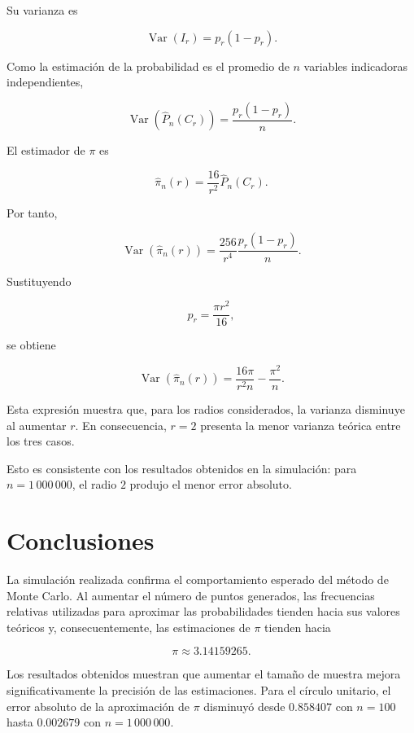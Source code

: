 \documentclass[12pt,a4paper]{article}
\begin{document}
Su varianza es

\[
\operatorname{Var}(I_r)
=
p_r(1-p_r).
\]

Como la estimación de la probabilidad es el promedio de \(n\)
variables indicadoras independientes,

\[
\operatorname{Var}
\left(
\widehat{P}_n(C_r)
\right)
=
\frac{p_r(1-p_r)}{n}.
\]

El estimador de \(\pi\) es

\[
\widehat{\pi}_n(r)
=
\frac{16}{r^2}
\widehat{P}_n(C_r).
\]

Por tanto,

\[
\operatorname{Var}
\left(
\widehat{\pi}_n(r)
\right)
=
\frac{256}{r^4}
\frac{p_r(1-p_r)}{n}.
\]

Sustituyendo

\[
p_r=\frac{\pi r^2}{16},
\]

se obtiene

\[
\operatorname{Var}
\left(
\widehat{\pi}_n(r)
\right)
=
\frac{16\pi}{r^2n}
-
\frac{\pi^2}{n}.
\]

Esta expresión muestra que, para los radios considerados, la varianza
disminuye al aumentar \(r\). En consecuencia, \(r=2\) presenta la
menor varianza teórica entre los tres casos.

Esto es consistente con los resultados obtenidos en la simulación:
para \(n=1\,000\,000\), el radio \(2\) produjo el menor error absoluto.


\section{Conclusiones}

La simulación realizada confirma el comportamiento esperado del método
de Monte Carlo. Al aumentar el número de puntos generados, las
frecuencias relativas utilizadas para aproximar las probabilidades
tienden hacia sus valores teóricos y, consecuentemente, las
estimaciones de \(\pi\) tienden hacia

\[
\pi\approx3.14159265.
\]

Los resultados obtenidos muestran que aumentar el tamaño de muestra
mejora significativamente la precisión de las estimaciones. Para el
círculo unitario, el error absoluto de la aproximación de \(\pi\)
disminuyó desde \(0.858407\) con \(n=100\) hasta \(0.002679\) con
\(n=1\,000\,000\).
\end{document}
